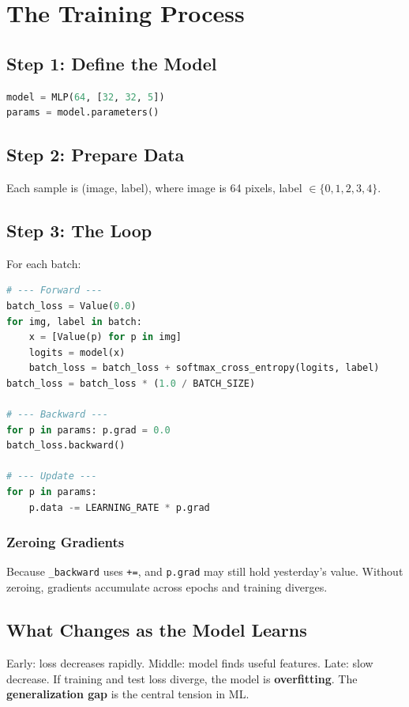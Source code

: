 \documentclass[11pt,a4paper]{book}
\begin{document}
\chapter{The Training Process}\label{ch:training}

\section{Step 1: Define the Model}
\begin{lstlisting}[language=Python, caption={Model creation}]
model = MLP(64, [32, 32, 5])
params = model.parameters()
\end{lstlisting}

\section{Step 2: Prepare Data}
Each sample is (image, label), where image is 64 pixels, label $\in \{0,1,2,3,4\}$.

\section{Step 3: The Loop}
For each batch:
\begin{lstlisting}[language=Python, caption={Complete training step}]
# --- Forward ---
batch_loss = Value(0.0)
for img, label in batch:
    x = [Value(p) for p in img]
    logits = model(x)
    batch_loss = batch_loss + softmax_cross_entropy(logits, label)
batch_loss = batch_loss * (1.0 / BATCH_SIZE)

# --- Backward ---
for p in params: p.grad = 0.0
batch_loss.backward()

# --- Update ---
for p in params:
    p.data -= LEARNING_RATE * p.grad
\end{lstlisting}

\subsection{Zeroing Gradients}
Because \texttt{\_backward} uses \texttt{+=}, and \texttt{p.grad} may still hold yesterday's value. Without zeroing, gradients accumulate across epochs and training diverges.

\section{What Changes as the Model Learns}
Early: loss decreases rapidly. Middle: model finds useful features. Late: slow decrease. If training and test loss diverge, the model is \textbf{overfitting}. The \textbf{generalization gap} is the central tension in ML.
\end{document}
